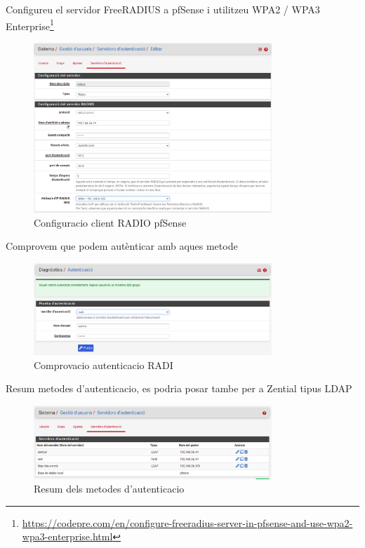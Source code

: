 \documentclass[
  10pt,
]{krantz}
\DeclareRobustCommand{\href}[2]{#2\footnote{\url{#1}}}
\begin{document}
\href{https://codepre.com/en/configure-freeradius-server-in-pfsense-and-use-wpa2-wpa3-enterprise.html}{Configureu el servidor FreeRADIUS a pfSense i utilitzeu WPA2 / WPA3 Enterprise}

\begin{figure}
\centering
\includegraphics[width=0.8\textwidth,height=\textheight]{imatges/proxmox/Client_Radio_pfsense.png}
\caption{Configuracio client RADIO pfSense}
\end{figure}

Comprovem que podem autènticar amb aques metode

\begin{figure}
\centering
\includegraphics[width=0.8\textwidth,height=\textheight]{imatges/proxmox/Prova_radi_aut.png}
\caption{Comprovacio autenticacio RADI}
\end{figure}

Resum metodes d'autenticacio, es podria posar tambe per a Zential tipus LDAP

\begin{figure}
\centering
\includegraphics[width=0.8\textwidth,height=\textheight]{imatges/proxmox/Metodes_aut.png}
\caption{Resum dels metodes d'autenticacio}
\end{figure}
\end{document}
